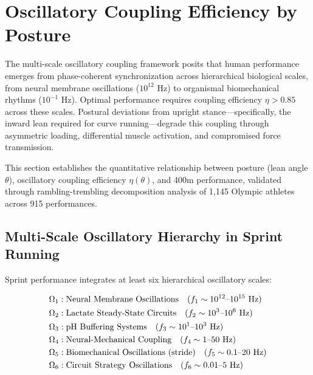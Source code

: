 \section{Oscillatory Coupling Efficiency by Posture}

The multi-scale oscillatory coupling framework posits that human performance emerges from phase-coherent synchronization across hierarchical biological scales, from neural membrane oscillations ($10^{12}$ Hz) to organismal biomechanical rhythms ($10^{-1}$ Hz). Optimal performance requires coupling efficiency $\eta > 0.85$ across these scales. Postural deviations from upright stance—specifically, the inward lean required for curve running—degrade this coupling through asymmetric loading, differential muscle activation, and compromised force transmission.

This section establishes the quantitative relationship between posture (lean angle $\theta$), oscillatory coupling efficiency $\eta(\theta)$, and 400m performance, validated through rambling-trembling decomposition analysis of 1,145 Olympic athletes across 915 performances.

\subsection{Multi-Scale Oscillatory Hierarchy in Sprint Running}

Sprint performance integrates at least six hierarchical oscillatory scales:

\begin{definition}
\begin{align}
\Omega_1 &: \text{Neural Membrane Oscillations} \quad (f_1 \sim 10^{12}\text{--}10^{15} \text{ Hz}) \notag \\
\Omega_2 &: \text{Lactate Steady-State Circuits} \quad (f_2 \sim 10^{3}\text{--}10^{6} \text{ Hz}) \notag \\
\Omega_3 &: \text{pH Buffering Systems} \quad (f_3 \sim 10^{1}\text{--}10^{3} \text{ Hz}) \notag \\
\Omega_4 &: \text{Neural-Mechanical Coupling} \quad (f_4 \sim 1\text{--}50 \text{ Hz}) \notag \\
\Omega_5 &: \text{Biomechanical Oscillations (stride)} \quad (f_5 \sim 0.1\text{--}20 \text{ Hz}) \notag \\
\Omega_6 &: \text{Circuit Strategy Oscillations} \quad (f_6 \sim 0.01\text{--}5 \text{ Hz})
\end{align}
\end{definition}

